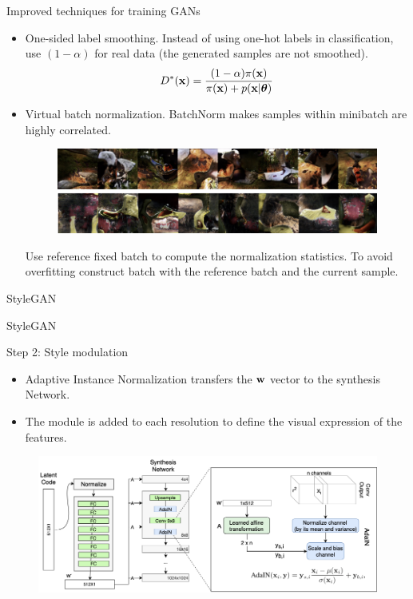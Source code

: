 \begin{frame}{Improved techniques for training GANs}
	\begin{itemize}
		\item One-sided label smoothing. Instead of using one-hot labels in classification, use $(1 - \alpha)$ for real data (the generated samples are not smoothed).
		\[
			D^*(\mathbf{x}) = \frac{(1 - \alpha )\pi(\mathbf{x})}{\pi(\mathbf{x}) + p(\mathbf{x} | \boldsymbol{\theta})}
		\]
		\item Virtual batch normalization. BatchNorm makes samples within minibatch are highly correlated.
		\begin{figure}
			\centering
			\includegraphics[width=0.6\linewidth]{figs/virtual_batch_norm}
		\end{figure}
	Use reference fixed batch to compute the normalization statistics. To avoid overfitting construct batch with the reference batch and the current sample. 
	\end{itemize}
\end{frame}
\begin{frame}{StyleGAN}
\end{frame}
\begin{frame}{StyleGAN}
	\begin{block}{Step 2: Style modulation}
		\begin{itemize}
			\item Adaptive Instance Normalization transfers the $\mathbf{w}$ vector to the synthesis Network.
			\item The module is added to each resolution to define the visual expression of the features.
		\end{itemize}
		\begin{figure}
			\centering
			\includegraphics[width=1.0\linewidth]{figs/stylegan_adain}
		\end{figure}
	\end{block}

\end{frame}
